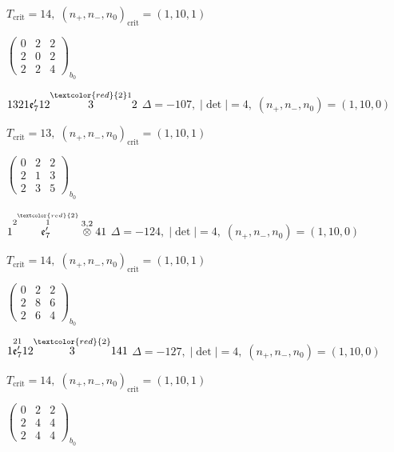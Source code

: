 \documentclass[10pt]{article}
\begin{document}
\hspace{1em}$T_{\text{crit}}=14,\; (n_+,n_-,n_0)_{\text{crit}}=(1,10,1)$

\hspace{2em}$\left(\begin{smallmatrix}0 & 2 & 2 \\ 2 & 0 & 2 \\ 2 & 2 & 4\end{smallmatrix}\right)_{\!b_0}$

\smallskip

$1321\mathfrak{e}_7'12\overset{\textcolor{red}{2}1}{3}2$ \quad $\Delta=-107,\; |\det|=4,\; (n_+,n_-,n_0)=(1,10,0)$

\hspace{1em}$T_{\text{crit}}=13,\; (n_+,n_-,n_0)_{\text{crit}}=(1,10,1)$

\hspace{2em}$\left(\begin{smallmatrix}0 & 2 & 2 \\ 2 & 1 & 3 \\ 2 & 3 & 5\end{smallmatrix}\right)_{\!b_0}$

\smallskip

$1\overset{2\overset{\textcolor{red}{2}}{1}}{\mathfrak{e}_7'}\overset{3,2}{\otimes}41$ \quad $\Delta=-124,\; |\det|=4,\; (n_+,n_-,n_0)=(1,10,0)$

\hspace{1em}$T_{\text{crit}}=14,\; (n_+,n_-,n_0)_{\text{crit}}=(1,10,1)$

\hspace{2em}$\left(\begin{smallmatrix}0 & 2 & 2 \\ 2 & 8 & 6 \\ 2 & 6 & 4\end{smallmatrix}\right)_{\!b_0}$

$1\overset{21}{\mathfrak{e}_7'}12\overset{\textcolor{red}{2}}{3}141$ \quad $\Delta=-127,\; |\det|=4,\; (n_+,n_-,n_0)=(1,10,0)$

\hspace{1em}$T_{\text{crit}}=14,\; (n_+,n_-,n_0)_{\text{crit}}=(1,10,1)$

\hspace{2em}$\left(\begin{smallmatrix}0 & 2 & 2 \\ 2 & 4 & 4 \\ 2 & 4 & 4\end{smallmatrix}\right)_{\!b_0}$
\end{document}
